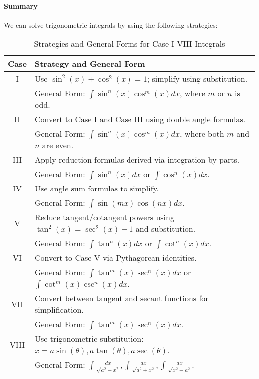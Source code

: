 \documentclass[11pt]{article}
\begin{document}
\paragraph{Summary} We can solve trigonometric integrals by using the following strategies:
\begin{table}[h!]
    \centering
    \begin{tabular}{|c|l|}
    \hline
    \textbf{Case} & \textbf{Strategy and General Form} \\ \hline
    I   & Use \(\sin^2(x) + \cos^2(x) = 1\); simplify using substitution. \\
        & General Form: \(\int \sin^n(x) \cos^m(x) dx\), where \(m\) or \(n\) is odd. \\ \hline
    II  & Convert to Case I and Case III using double angle formulas. \\
        & General Form: \(\int \sin^n(x) \cos^m(x) dx\), where both \(m\) and \(n\) are even. \\ \hline
    III & Apply reduction formulas derived via integration by parts. \\
        & General Form: \(\int \sin^n(x) dx\) or \(\int \cos^n(x) dx\). \\ \hline
    IV  & Use angle sum formulas to simplify. \\
        & General Form: \(\int \sin(mx) \cos(nx) dx\). \\ \hline
    V   & Reduce tangent/cotangent powers using \(\tan^2(x) = \sec^2(x) - 1\) and substitution. \\
        & General Form: \(\int \tan^n(x) dx\) or \(\int \cot^n(x) dx\). \\ \hline
    VI  & Convert to Case V via Pythagorean identities. \\
        & General Form: \(\int \tan^m(x) \sec^n(x) dx\) or \(\int \cot^m(x) \csc^n(x) dx\). \\ \hline
    VII & Convert between tangent and secant functions for simplification. \\
        & General Form: \(\int \tan^m(x) \sec^n(x) dx\). \\ \hline
    VIII & Use trigonometric substitution: \(x = a \sin(\theta), a \tan(\theta), a \sec(\theta)\). \\
         & General Form: \(\int \frac{dx}{\sqrt{a^2 - x^2}}, \int \frac{dx}{\sqrt{a^2 + x^2}}, \int \frac{dx}{\sqrt{x^2 - a^2}}\). \\ \hline
    \end{tabular}
    \caption{Strategies and General Forms for Case I-VIII Integrals}
\end{table}
\end{document}
